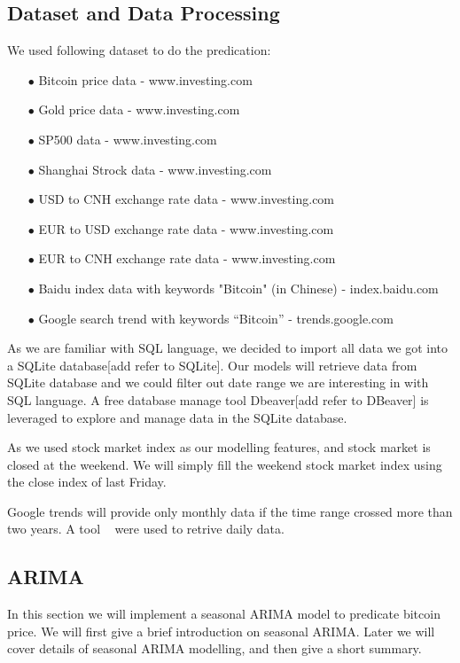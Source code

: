 \documentclass[10pt,twocolumn,letterpaper]{article}
\begin{document}
\subsection{Dataset and Data Processing}
 
We used following dataset to do the predication:
\begin{itemize}
\item[$\bullet$] Bitcoin price data - www.investing.com
\item[$\bullet$] Gold price data - www.investing.com
\item[$\bullet$] SP500 data - www.investing.com
\item[$\bullet$] Shanghai Strock data - www.investing.com
\item[$\bullet$] USD to CNH exchange rate data - www.investing.com
\item[$\bullet$] EUR to USD exchange rate data - www.investing.com
\item[$\bullet$] EUR to CNH exchange rate data - www.investing.com
\item[$\bullet$] Baidu index data with keywords "Bitcoin" (in Chinese) - index.baidu.com
\item[$\bullet$] Google search trend with keywords “Bitcoin” - trends.google.com
\end{itemize}

As we are familiar with SQL language, we decided to import all data we got into a SQLite database[add refer to SQLite]. Our models will retrieve data from SQLite database and we could filter out date range we are interesting in with SQL language. A free database manage tool Dbeaver[add refer to DBeaver] is leveraged to explore and manage data in the SQLite database.

As we used stock market index as our modelling features, and stock market is closed at the weekend. We will simply fill the weekend stock market index using the close index of last Friday.

Google trends will provide only monthly data if the time range crossed more than two years. A tool ~\cite{tool01} were used to retrive daily data.

\subsection{ARIMA}

In this section we will implement a seasonal ARIMA model to predicate bitcoin price. We will first give a brief introduction on seasonal ARIMA. Later we will cover details of seasonal ARIMA modelling, and then give a short summary.
{}
\end{document}
